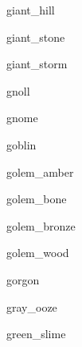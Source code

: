 \documentclass[letterpaper,serif]{module}
\begin{document}
\begin{newmonster}{giant_hill}\end{newmonster}

\begin{newmonster}{giant_stone}\end{newmonster}

\begin{newmonster}{giant_storm}\end{newmonster}

\begin{newmonster}{gnoll}\end{newmonster}

\begin{newmonster}{gnome}\end{newmonster}

\begin{newmonster}{goblin}\end{newmonster}

\begin{newmonster}{golem_amber}\end{newmonster}

\begin{newmonster}{golem_bone}\end{newmonster}

\begin{newmonster}{golem_bronze}\end{newmonster}

\begin{newmonster}{golem_wood}\end{newmonster}

\begin{newmonster}{gorgon}\end{newmonster}

\begin{newmonster}{gray_ooze}\end{newmonster}

\begin{newmonster}{green_slime}\end{newmonster}
\end{document}
